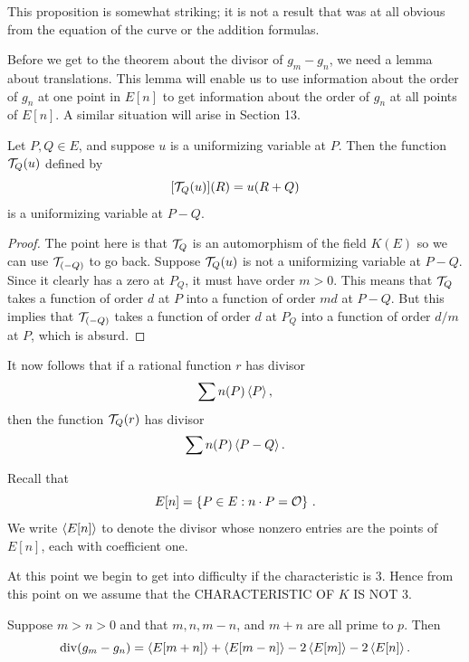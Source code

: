 This proposition is somewhat striking; it is not a result that was at all obvious from the equation of the curve or the addition formulas.

\bigskip
Before we get to the theorem about the divisor of $g_{m}-g_{n}$, we need a lemma about translations. This lemma will enable us to use information about the order of $g_{n}$ at one point in $E[n]$ to get information about the order of $g_{n}$ at all points of $E[n]$. A similar situation will arise in Section 13.

\begin{lem}
\label{l8.5}
Let $P,Q\in E$, and suppose $u$ is a uniformizing variable at $P$. Then the function $\mathcal{T}_{Q}(u)$ defined by
$$
[\mathcal{T}_{Q}(u)](R)=u(R+Q)
$$
is a uniformizing variable at $P-Q$.
\end{lem}

\begin{proof} The point here is that $\mathcal{T}_{Q}$ is an automorphism of the field $K(E)$ so we can use $\mathcal{T}_{(-Q)}$ to go back. Suppose $\mathcal{T}_{Q}(u)$ is not a uniformizing variable at $P-Q$. Since it clearly has a zero at $P_{Q}$, it must have order $m>0$. This means that $\mathcal{T}_{Q}$ takes a function of order $d$ at $P$ into a function of order $md$ at $P-Q$. But this implies that $\mathcal{T}_{(-Q)}$ takes a function of order $d$ at $P_{Q}$ into a function of order $d/m$ at $P$, which is absurd.
\end{proof}
It now follows that if a rational function $r$ has divisor \[\sum n(P)\left\langle P \right \rangle,\] then the function $\mathcal{T}_{Q}(r)$ has divisor \[\sum n(P)\left\langle P-Q \right \rangle.\]

Recall that
$$E[n]=\{P\in E:n\cdot P=\mathcal{O}\}\ .$$
We write $\left\langle E[n] \right \rangle$ to denote the divisor whose nonzero entries are the points of $E[n]$, each with coefficient one.

At this point we begin to get into difficulty if the characteristic is 3. Hence from this point on we assume that the CHARACTERISTIC OF $K$ IS NOT 3.

\begin{theo}
\label{t8.6}
Suppose $m>n>0$ and that $m,n,m-n$, and $m+n$ are all prime to $p$. Then
\begin{equation}
\label{eq1.18}
\operatorname{div}(g_{m}-g_{n})=\left\langle E[m+n] \right \rangle+\left\langle E[m-n] \right \rangle-2\left\langle E[m] \right \rangle-2\left\langle E[n] \right \rangle .
\end{equation}
\end{theo}

